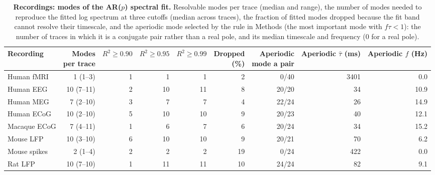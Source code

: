 \begin{table}[h]
\caption{\textbf{Recordings: modes of the AR($p$) spectral fit.} Resolvable modes per trace (median and range), the number of modes needed to reproduce the fitted log spectrum at three cutoffs (median across traces), the fraction of fitted modes dropped because the fit band cannot resolve their timescale, and the aperiodic mode selected by the rule in Methods (the most important mode with $f\tau < 1$): the number of traces in which it is a conjugate pair rather than a real pole, and its median timescale and frequency (0 for a real pole).}\label{tab:s_modes}
\setlength{\tabcolsep}{3pt}
\begin{tabular}{lrrrrrrrr}
\toprule
Recording & \shortstack[c]{Modes \\ per trace} & $R^2 \ge 0.90$ & $R^2 \ge 0.95$ & $R^2 \ge 0.99$ & \shortstack[c]{Dropped \\ (\%)} & \shortstack[c]{Aperiodic \\ mode a pair} & \shortstack[c]{Aperiodic \\ $\hat\tau$ (ms)} & \shortstack[c]{Aperiodic \\ $f$ (Hz)} \\
\midrule
Human fMRI & 1 (1--3) & 1 & 1 & 1 & 2 & 0/40 & 3401 & 0.0 \\
Human EEG & 10 (7--11) & 2 & 10 & 11 & 8 & 20/20 & 34 & 10.9 \\
Human MEG & 7 (2--10) & 3 & 7 & 7 & 4 & 22/24 & 26 & 14.9 \\
Human ECoG & 10 (2--10) & 5 & 10 & 10 & 9 & 20/23 & 40 & 12.1 \\
Macaque ECoG & 7 (4--11) & 1 & 6 & 7 & 6 & 20/24 & 34 & 15.2 \\
Mouse LFP & 10 (3--10) & 6 & 10 & 10 & 9 & 20/21 & 70 & 6.2 \\
Mouse spikes & 2 (1--4) & 2 & 2 & 2 & 19 & 0/24 & 422 & 0.0 \\
Rat LFP & 10 (7--10) & 1 & 11 & 11 & 10 & 24/24 & 82 & 9.1 \\
\bottomrule
\end{tabular}
\end{table}
